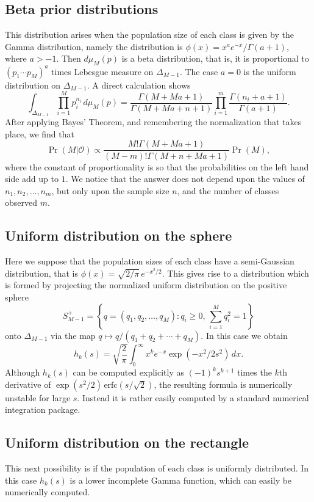 \documentclass{amsart}
\begin{document}
\subsection*{Beta prior distributions}
This distribution arises when the population size of
each class is given by the Gamma distribution, namely the distribution
is $\phi(x) = x^a e^{-x}/\Gamma(a+1)$, where $a>-1$.
Then $d\mu_M(p)$ is a beta distribution, that is, it is proportional to 
$(p_1\cdots p_M)^a$ times Lebesgue measure on $\Delta_{M-1}$.
The case $a = 0$ is
the uniform distribution on $\Delta_{M-1}$.  A direct calculation shows
$$ \int_{\Delta_{M-1}} \prod_{i=1}^M p_i^{n_i} \, d\mu_M(p) = 
   \frac{\Gamma(M+Ma+1)}{\Gamma(M+Ma+n+1)}
   \prod_{i=1}^m\frac{\Gamma(n_i+a+1)}{\Gamma(a+1)} .$$
After applying Bayes' Theorem, and remembering the normalization
that takes place, we find that
$$ \Pr(M|\mathcal O) \propto \frac{M!\Gamma(M+Ma+1)}{(M-m)!\Gamma(M+n+Ma+1)}
   \Pr(M) ,$$
where the constant of proportionality is so that the probabilities on
the left hand side add up to $1$.  We notice that the
answer does not depend upon the values of $n_1,n_2,\dots,n_m$, but only
upon the sample size $n$, and the number of classes observed $m$.

\subsection*{Uniform distribution on the sphere}
Here we suppose that the population sizes of each class
have a semi-Gaussian distribution, that is
$\phi(x) = \sqrt{2/\pi} \, e^{-x^2/2}$.  
This gives rise to a distribution which is
formed by projecting the normalized uniform distribution on the positive
sphere
$$ S^+_{M-1} = \left\{q=(q_1,q_2,\dots,q_M):q_i \ge 0, \, \sum_{i=1}^M q_i^2 = 1
   \right\} $$
onto $\Delta_{M-1}$ via the map $q \mapsto q/(q_1+q_2+\cdots+q_M)$.
In this case we obtain
$$ h_k(s) 
   = \sqrt{\frac2\pi} \int_0^\infty x^k e^{-x} \exp(-x^2/2s^2) \, dx .$$
Although $h_k(s)$ can be computed explicitly 
as $(-1)^k s^{k+1}$ times the $k$th derivative of $\exp(s^2/2)
\, \text{erfc}(s/\sqrt2)$, the resulting formula is numerically unstable for large $s$.
Instead it is rather easily computed by a
standard numerical integration package.

\subsection*{Uniform distribution on the rectangle}

This next possibility is if the population of each class is 
uniformly distributed.  In this case
$h_k(s)$ is a lower incomplete Gamma function,
which can 
easily be numerically computed.
\end{document}
